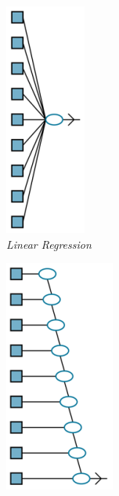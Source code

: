 \begin{figure}[h!]
  \centering
  \begin{subfigure}{.33\textwidth}
    \centering
    \includegraphics[width=.34\linewidth]{gambar/LinearRegression.png}
    \caption{\emph{Linear Regression}}
    \label{linearregression}
  \end{subfigure}%
  \begin{subfigure}{.33\textwidth}
    \centering
    \includegraphics[width=.45\linewidth]{gambar/DecisionListNetwork.png}

\end{subfigure}
\end{figure}
